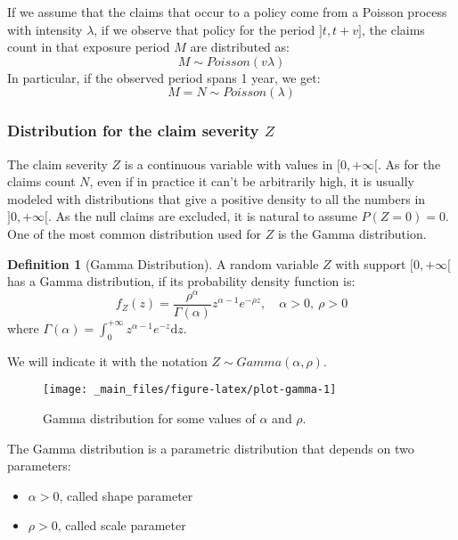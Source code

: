 \documentclass[a4paper, nobind]{templates/ociamthesis}
\providecommand{\tightlist}{%
  \setlength{\itemsep}{0pt}\setlength{\parskip}{0pt}}
\theoremstyle{definition}
\newtheorem{definition}{Definition}[chapter]
\theoremstyle{definition}
\theoremstyle{definition}
\theoremstyle{remark}
\begin{document}
If we assume that the claims that occur to a policy come from a Poisson process with intensity \(\lambda\), if we observe that policy for the period \(]t, t+v]\), the claims count in that exposure period \(M\) are distributed as:
\[ M\sim Poisson(v \lambda) \]
In particular, if the observed period spans 1 year, we get:
\[ M = N \sim Poisson(\lambda) \]

\hypertarget{distribution-for-the-claim-severity-z}{%
\subsubsection{\texorpdfstring{Distribution for the claim severity \(Z\)}{Distribution for the claim severity Z}}\label{distribution-for-the-claim-severity-z}}

The claim severity \(Z\) is a continuous variable with values in \([0, +\infty[\). As for the claims count \(N\), even if in practice it can't be arbitrarily high, it is usually modeled with distributions that give a positive density to all the numbers in \(]0, +\infty[\). As the null claims are excluded, it is natural to assume \(P\left( Z=0 \right) = 0\). One of the most common distribution used for \(Z\) is the Gamma distribution.

\begin{definition}[Gamma Distribution]
\label{def:def-gamma} \iffalse (Gamma Distribution) \fi{} A random variable \(Z\) with support \([0, +\infty[\) has a Gamma distribution, if its probability density function is:
\[
f_Z(z) = \frac{\rho^\alpha}{\Gamma(\alpha)}z^{\alpha-1}e^{-\rho z}, \quad \alpha > 0, \ \rho > 0
\]
where \(\Gamma(\alpha) = \int_{0}^{+\infty}{z^{\alpha - 1} e^{-z} \mathrm{d} z}\).

We will indicate it with the notation \(Z \sim Gamma(\alpha, \rho)\).
\end{definition}

\begin{figure}[!hbtp]

{\centering \texttt{[image: \_main\_files/figure-latex/plot-gamma-1]} 

}

\caption{Gamma distribution for some values of $\alpha$ and $\rho$.}\label{fig:plot-gamma}
\end{figure}

The Gamma distribution is a parametric distribution that depends on two parameters:

\begin{itemize}
\tightlist
\item
  \(\alpha > 0\), called shape parameter
\item
  \(\rho > 0\), called scale parameter
\end{itemize}
\end{document}
